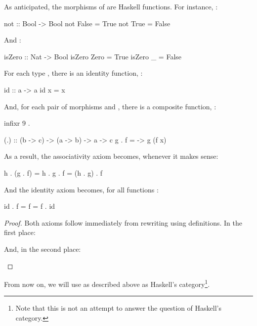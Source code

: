 As anticipated, the morphisms of \hask are Haskell functions. For
instance, :
\begin{codehaskell}
not :: Bool -> Bool
not False = True
not True  = False
\end{codehaskell}
And :
\begin{codehaskell}
isZero :: Nat -> Bool
isZero Zero = True
isZero _    = False
\end{codehaskell}

For each type , there is an identity function,
:
\begin{codehaskell}
id :: a -> a
id x = x
\end{codehaskell}
And, for each pair of morphisms  and
, there is a composite function,
:
\begin{codehaskell}
infixr 9 .

(.) :: (b -> c) -> (a -> b) -> a -> c
g . f = \x -> g (f x)
\end{codehaskell}

As a result, the associativity axiom becomes, whenever it makes sense:
\begin{codehaskell}
h . (g . f) = h . g . f = (h . g) . f
\end{codehaskell}
And the identity axiom becomes, for all functions :
\begin{codehaskell}
id . f = f = f . id
\end{codehaskell}

\begin{proof}

  Both axioms follow immediately from rewriting using definitions. In
  the first place:
  \begin{steps}
  \end{steps}
  And, in the second place:
  \begin{steps}
  \end{steps}

\end{proof}

From now on, we will use \hask as described above as Haskell's
category\footnote{Note that this is not an attempt to answer the
  question of Haskell's category.}.

